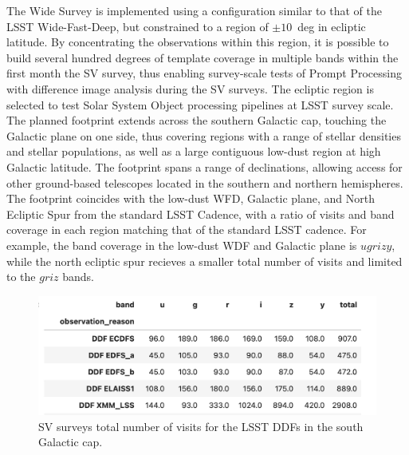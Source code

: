 The Wide Survey is implemented using a configuration similar to that of the LSST Wide-Fast-Deep, but constrained to a region of $\pm10$~deg in ecliptic latitude.
By concentrating the observations within this region, it is possible to build several hundred degrees of template coverage in multiple bands within the first month the SV survey, thus enabling survey-scale tests of Prompt Processing with difference image analysis during the SV surveys.
The ecliptic region is selected to test Solar System Object processing pipelines at LSST survey scale.
The planned footprint extends across the southern Galactic cap, touching the Galactic plane on one side, thus covering regions with a range of stellar densities and stellar populations, as well as a large contiguous low-dust region at high Galactic latitude.
The footprint spans a range of declinations, allowing access for other ground-based telescopes located in the southern and northern hemispheres.
The footprint coincides with the low-dust WFD, Galactic plane, and North Ecliptic Spur from the standard LSST Cadence, with a ratio of visits and band coverage in each region matching that of the standard LSST cadence.
For example, the band coverage in the low-dust WDF and Galactic plane is $ugrizy$, while the north ecliptic spur recieves a smaller total number of visits and limited to the $griz$ bands.

\begin{figure}[htbp]
    \begin{center}
    \includegraphics[width=1\textwidth]{./sv_surveys_ddf_visits.png}
    \caption{SV surveys total number of visits for the LSST DDFs in the south Galactic cap.}
    \label{sv_surveys_ddf_visits}
    \end{center}
\end{figure}

